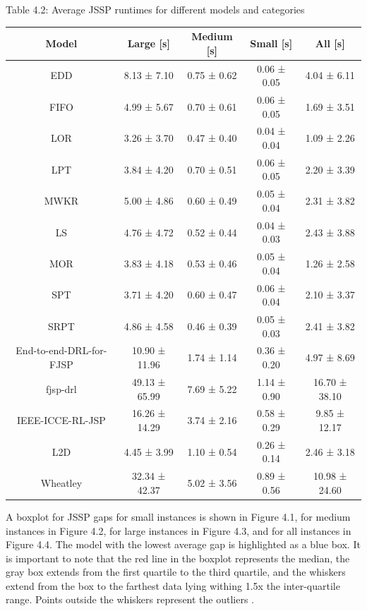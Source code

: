 \begin{table}
    Table 4.2: Average JSSP runtimes for different models and categories\\
    \vspace{1mm}
    \label{table:4.2}
    \small
    \begin{tabular}{ccccc}
        \toprule
        Model & Large [s] & Medium [s] & Small [s] & All [s] \\
        \midrule
        EDD & 8.13 ± 7.10 & 0.75 ± 0.62 & 0.06 ± 0.05 & 4.04 ± 6.11 \\
        FIFO & 4.99 ± 5.67 & 0.70 ± 0.61 & 0.06 ± 0.05 & 1.69 ± 3.51 \\
        LOR & 3.26 ± 3.70 & 0.47 ± 0.40 & 0.04 ± 0.04 & 1.09 ± 2.26 \\
        LPT & 3.84 ± 4.20 & 0.70 ± 0.51 & 0.06 ± 0.05 & 2.20 ± 3.39 \\
        MWKR & 5.00 ± 4.86 & 0.60 ± 0.49 & 0.05 ± 0.04 & 2.31 ± 3.82 \\
        LS & 4.76 ± 4.72 & 0.52 ± 0.44 & 0.04 ± 0.03 & 2.43 ± 3.88 \\
        MOR & 3.83 ± 4.18 & 0.53 ± 0.46 & 0.05 ± 0.04 & 1.26 ± 2.58 \\
        SPT & 3.71 ± 4.20 & 0.60 ± 0.47 & 0.06 ± 0.04 & 2.10 ± 3.37 \\
        SRPT & 4.86 ± 4.58 & 0.46 ± 0.39 & 0.05 ± 0.03 & 2.41 ± 3.82 \\
        End-to-end-DRL-for-FJSP & 10.90 ± 11.96 & 1.74 ± 1.14 & 0.36 ± 0.20 & 4.97 ± 8.69 \\
        fjsp-drl & 49.13 ± 65.99 & 7.69 ± 5.22 & 1.14 ± 0.90 & 16.70 ± 38.10 \\
        IEEE-ICCE-RL-JSP & 16.26 ± 14.29 & 3.74 ± 2.16 & 0.58 ± 0.29 & 9.85 ± 12.17 \\
        L2D & 4.45 ± 3.99 & 1.10 ± 0.54 & 0.26 ± 0.14 & 2.46 ± 3.18 \\
        Wheatley & 32.34 ± 42.37 & 5.02 ± 3.56 & 0.89 ± 0.56 & 10.98 ± 24.60 \\
        \bottomrule
        \end{tabular}        
\end{table}

A boxplot for JSSP gaps for small instances is shown in Figure 4.1, for medium instances in Figure 4.2, for large instances in Figure 4.3, and for all instances in Figure 4.4. The model with the lowest average gap is highlighted as a blue box. It is important to note that the red line in the boxplot represents the median, the gray box extends from the first quartile to the third quartile, and the whiskers extend from the box to the farthest data lying withing 1.5x the inter-quartile range. Points outside the whiskers represent the outliers \cite{matplotlib_boxplot}.

